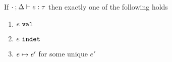\begin{theorem}[Determinism]
  \label{thrm:determinism}
  If $\cdot \mathbin{;} \Delta \vdash e : \tau$ then exactly one of the following holds
  \begin{enumerate}
    \item $e ~\mathtt{val}$
    \item $e ~\mathtt{indet}$
    \item $e \mapsto e'$ for some unique $e'$
  \end{enumerate}
\end{theorem}

